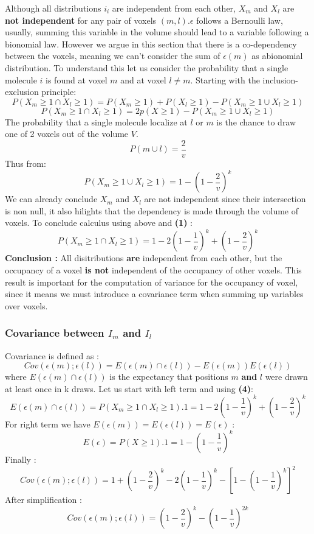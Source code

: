 \documentclass{article}
\begin{document}
Although all distributions $i_i$ are independent from each other, $X_m$ and $X_l$ are \textbf{not independent} for
any pair of voxels $(m,l)$.$\epsilon$ follows a Bernoulli law, usually, summing this variable in the volume should
lead to a variable following a bionomial law. However we argue in this section that there is a co-dependency between
the voxels, meaning we can't consider the sum of $\epsilon (m)$ as abionomial distribution. 
To understand this let us consider the probability that a single molecule $i$ is found at voxel $m$ and at voxel $l \neq m$.
Starting with the inclusion-exclusion principle:
\[
P(X_m \geq 1 \cap X_l \geq 1) = P(X_m \geq 1) + P(X_l \geq 1) - P(X_m\geq 1 \cup X_l\geq 1)
\]
\[
P(X_m \geq 1 \cap X_l \geq 1) = 2p(X \geq 1) - P(X_m\geq 1 \cup X_l\geq 1)
\]
The probability that a single molecule localize at $l$ or $m$ is the chance to draw one of 2 voxels out of the volume $V$.
\[
P(m \cup l) = \frac{2}{v}
\]
Thus from:
\[
P({X_m\geq 1 \cup X_l\geq 1}) = 1 - (1-\frac{2}{v})^{k}
\]
We can already conclude $X_m$ and $X_l$ are not independent since their intersection is non null, it also hilights that the dependency is made through
the volume of voxels. To conclude calculus using above and \textbf{(1)} :
\begin{equation}
    P(X_m \geq 1 \cap X_l \geq 1) =  1 - 2(1-\frac{1}{v})^{k} + (1-\frac{2}{v})^{k} 
\end{equation}
\textbf{Conclusion : }All disitributions \textbf{are} independent from each other, but the occupancy of a voxel \textbf{is not} independent of the
occupancy of other voxels. This result is important for the computation of variance for the occupancy of voxel, since it means we must introduce a 
covariance term when summing up variables over voxels.

\subsubsection{Covariance between $I_m$ and $I_l$}

Covariance is defined as :
\[
    Cov(\epsilon(m);\epsilon(l)) = E(\epsilon(m) \cap \epsilon(l)) - E(\epsilon(m))E(\epsilon(l))
\]
where $E(\epsilon(m) \cap \epsilon(l))$ is the expectancy that positions $m$ \textbf{and} $l$ were drawn at least once in k draws. Let us start with left term  and 
using \textbf{(4)}:
\[
    E(\epsilon(m) \cap \epsilon(l)) = P(X_m \geq 1 \cap X_l \geq 1).1 = 1 - 2(1-\frac{1}{v})^{k} + (1-\frac{2}{v})^{k}
\]
For right term we have $E(\epsilon(m)) = E(\epsilon(l)) = E(\epsilon)$ :
\[
E(\epsilon) = P(X\geq1).1 = 1-(1 - \frac{1}{v})^k
\]
Finally :
\[
    Cov(\epsilon(m);\epsilon(l)) =  1 + (1-\frac{2}{v})^{k} - 2(1-\frac{1}{v})^{k} - [1-(1 - \frac{1}{v})^k]^2
\]
After simplification :
\begin{equation}
    Cov(\epsilon(m);\epsilon(l)) = (1-\frac{2}{v})^k - (1-\frac{1}{v})^{2k}
\end{equation}
\end{document}
